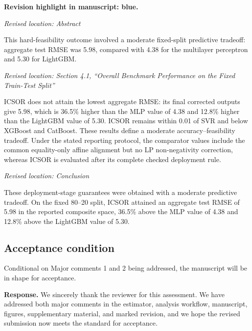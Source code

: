 \documentclass[11pt,a4paper]{article}
\newcommand{\revisionnotice}{\par\noindent\textcolor{revisionblue}{\textbf{Revision highlight in manuscript: blue.}}\par}
\newcommand{\excerptlocation}[1]{\par\noindent\textit{Revised location: #1}\par}
\begin{document}
\revisionnotice

\excerptlocation{Abstract}
\begin{revisionexcerpt}
This hard-feasibility outcome involved a moderate fixed-split predictive tradeoff: aggregate test RMSE was 5.98, compared with 4.38 for the multilayer perceptron and 5.30 for LightGBM.
\end{revisionexcerpt}

\excerptlocation{Section 4.1, ``Overall Benchmark Performance on the Fixed Train-Test Split''}
\begin{revisionexcerpt}
ICSOR does not attain the lowest aggregate RMSE: its final corrected outputs give 5.98, which is 36.5\% higher than the MLP value of 4.38 and 12.8\% higher than the LightGBM value of 5.30. ICSOR remains within 0.01 of SVR and below XGBoost and CatBoost. These results define a moderate accuracy--feasibility tradeoff. Under the stated reporting protocol, the comparator values include the common equality-only affine alignment but no LP non-negativity correction, whereas ICSOR is evaluated after its complete checked deployment rule.
\end{revisionexcerpt}

\excerptlocation{Conclusion}
\begin{revisionexcerpt}
These deployment-stage guarantees were obtained with a moderate predictive tradeoff. On the fixed 80--20 split, ICSOR attained an aggregate test RMSE of 5.98 in the reported composite space, 36.5\% above the MLP value of 4.38 and 12.8\% above the LightGBM value of 5.30.
\end{revisionexcerpt}

\subsection*{Acceptance condition}

\begin{reviewercomment}
Conditional on Major comments 1 and 2 being addressed, the manuscript will be in shape for acceptance.
\end{reviewercomment}

\noindent\textbf{Response.} We sincerely thank the reviewer for this assessment. We have addressed both major comments in the estimator, analysis workflow, manuscript, figures, supplementary material, and marked revision, and we hope the revised submission now meets the standard for acceptance.
\end{document}
